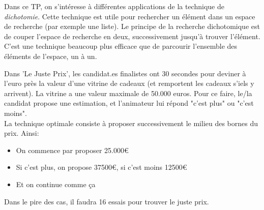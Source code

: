 

Dans ce TP, on s'intéresse à différentes applications de la technique de \emph{dichotomie}. Cette technique est utile pour rechercher un élément dans un espace de recherche (par exemple une liste). Le principe de la recherche dichotomique est de couper l'espace de recherche en deux, successivement jusqu'à trouver l'élément. C'est une technique beaucoup plus efficace que de parcourir l'ensemble des éléments de l'espace, un à un.

\begin{example}
	Dans 'Le Juste Prix', les candidat.es finalistes ont 30 secondes pour deviner à l'euro près la valeur d'une vitrine de cadeaux (et remportent les cadeaux s'iels y arrivent). La vitrine a une valeur maximale de 50.000 euros. Pour ce faire, le/la candidat propose une estimation, et l'animateur lui répond "c'est plus" ou "c'est moins".\\
	La technique optimale consiste à proposer successivement le milieu des bornes du prix. Ainsi:
	\begin{itemize}
		\item On commence par proposer 25.000€
		\item Si c'est plus, on propose 37500€, si c'est moins 12500€
		\item Et on continue comme ça
	\end{itemize}
	Dans le pire des cas, il faudra 16 essais pour trouver le juste prix.
\end{example}

